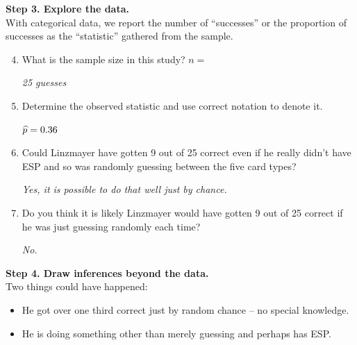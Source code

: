 {\bf Step 3. Explore the data. }\\
With categorical data, we  report the number of “successes”
or the proportion of successes as the ``statistic'' gathered from the
sample.  
 \begin{enumerate}
   \setcounter{enumi}{3}
   \item   What is the sample size in this study?  $n = $ 
\begin{students}
  \vspace{1cm}
\end{students}

\begin{key}
{\it 25 guesses}
\end{key}

   \item  Determine the observed statistic and use correct notation to
     denote it. 
\begin{students}
  \vspace{1cm}
\end{students}

\begin{key}
 $\widehat{p} = 0.36$
\end{key}

   \item  Could Linzmayer have gotten 9 out of 25 correct even if he
     really didn't have ESP and so was randomly guessing between the
     five card types? 
\begin{students}
  \vspace{1cm}
\end{students}

\begin{key}
{\it Yes, it is possible to do that well just by chance.}
\end{key}

   \item  Do you think it is likely Linzmayer would have gotten 9 out of 25
     correct if he was just guessing randomly each time?  
\begin{students}
  \vspace{1cm}
\end{students}

\begin{key}
{\it No.}
\end{key}

   \end{enumerate}
   
{\bf Step 4. Draw inferences beyond the data. }\\
Two things could have happened:\vspace{-.5cm}
\begin{itemize}
\item He got over one third correct just by  random chance -- no
  special knowledge.  
\item He is doing something other than merely guessing and perhaps has ESP.
\end{itemize}

